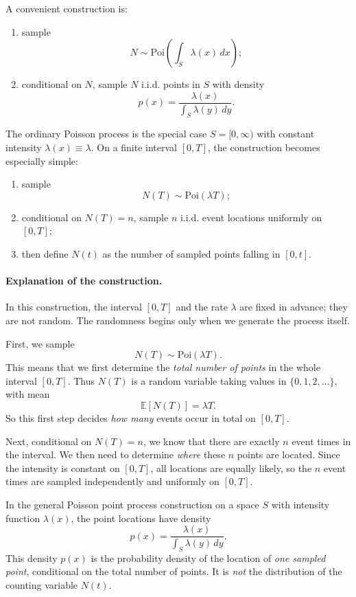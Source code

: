 \documentclass[11pt]{article}
\theoremstyle{definition}
\begin{document}
A convenient construction is:
\begin{enumerate}[leftmargin=2em]
    \item sample
    \[
    N\sim \mathrm{Poi}\!\left(\int_S \lambda(x)\,dx\right);
    \]
    \item conditional on $N$, sample $N$ i.i.d. points in $S$ with density
    \[
    p(x)=\frac{\lambda(x)}{\int_S \lambda(y)\,dy}.
    \]
\end{enumerate}

The ordinary Poisson process is the special case $S=[0,\infty)$ with constant intensity $\lambda(x)\equiv \lambda$.
On a finite interval $[0,T]$, the construction becomes especially simple:
\begin{enumerate}[leftmargin=2em]
    \item sample
    \[
    N(T)\sim \mathrm{Poi}(\lambda T);
    \]
    \item conditional on $N(T)=n$, sample $n$ i.i.d. event locations uniformly on $[0,T]$;
    \item then define $N(t)$ as the number of sampled points falling in $[0,t]$.
\end{enumerate}

\paragraph{Explanation of the construction.}
In this construction, the interval \( [0,T] \) and the rate \( \lambda \) are fixed in advance; they are not random. The randomness begins only when we generate the process itself.

First, we sample
\[
N(T)\sim \mathrm{Poi}(\lambda T).
\]
This means that we first determine the \emph{total number of points} in the whole interval \( [0,T] \). Thus \(N(T)\) is a random variable taking values in \(\{0,1,2,\dots\}\), with mean
\[
\mathbb E[N(T)] = \lambda T.
\]
So this first step decides \emph{how many} events occur in total on \( [0,T] \).

Next, conditional on \(N(T)=n\), we know that there are exactly \(n\) event times in the interval. We then need to determine \emph{where} these \(n\) points are located. Since the intensity is constant on \( [0,T] \), all locations are equally likely, so the \(n\) event times are sampled independently and uniformly on \( [0,T] \).

In the general Poisson point process construction on a space \(S\) with intensity function \(\lambda(x)\), the point locations have density
\[
p(x)=\frac{\lambda(x)}{\int_S \lambda(y)\,dy}.
\]
This density \(p(x)\) is the probability density of the location of \emph{one sampled point}, conditional on the total number of points. It is \emph{not} the distribution of the counting variable \(N(t)\).
\end{document}
